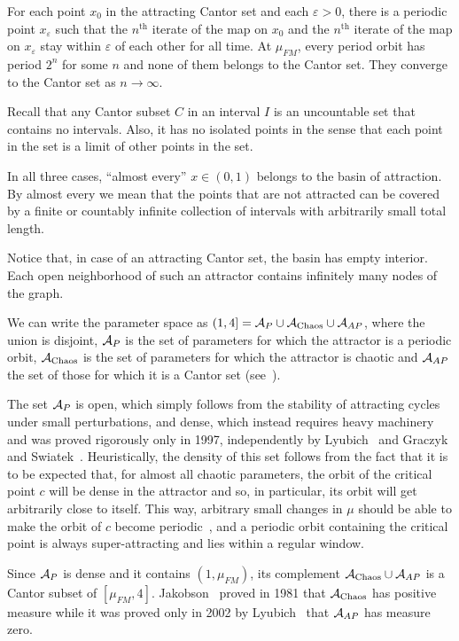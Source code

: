 \documentclass{article}
\def\AP{{\cal A}_P}
\def\AC{{\cal A}_{\text{Chaos}}}
\def\ALP{{\cal A}_{AP}}
\newcommand{\allviolet}{\color{violet}{}}
\begin{document}
For each point $x_0$ in the attracting Cantor set and each $\varepsilon>0$, there is a periodic point $x_{\varepsilon}$ such that the $n^{\text{th}}$ iterate of the map on $x_0$ and the $n^{\text{th}}$ iterate of the map on $x_{\varepsilon}$ stay within $\varepsilon$ of each other for all time. 
At $\mu_{FM}$, every period orbit has period $2^n$ for some $n$ and none of them belongs to the Cantor set. 
They converge to the Cantor set as $n\to\infty$.

Recall that any Cantor subset $C$ in an interval $I$ is an uncountable set that contains no intervals. 
Also, it has no isolated points in the sense that each point in the set is a limit of other points in the set. 

\medskip
In all three cases, ``almost every'' $x\in(0,1)$ belongs to the basin of attraction.
By almost every we mean that the points that are not attracted can be covered by a finite or countably infinite collection of intervals with arbitrarily small total length.

Notice that, in case of an attracting Cantor set, the basin has empty interior. Each open neighborhood of such an attractor contains infinitely many nodes of the graph.




We can write the parameter space as $(1,4]={\cal A}_P\cup\AC\cup\ALP$, where the union is disjoint, ${\cal A}_P$ is the set of parameters for which the attractor is a periodic orbit, $\AC$ is the set of parameters for which the attractor is chaotic and $\ALP$ the set of those for which it is a Cantor set  (see~\cite{JR80}).

The set ${\cal A}_P$ is open, which simply follows from the stability of attracting cycles under small perturbations, and dense, which instead requires heavy machinery and was proved rigorously only in 1997, independently by Lyubich~\cite{Lyu97} and Graczyk and Swiatek~\cite{GS97}. Heuristically, the density of this set follows from the fact that it is to be expected that, for almost all chaotic parameters, the orbit of the critical point $c$ will be dense in the attractor and so, in particular, its orbit will get arbitrarily close to itself. 
This way, arbitrary small changes in $\mu$ should be able to make the orbit of $c$ become periodic~\cite{Ott02}, and a periodic orbit containing the critical point is always super-attracting and lies within a regular window.

Since $\AP$ is dense and it contains $(1,\mu_{FM})$, its complement $\AC\cup\ALP$ is a Cantor subset of $[\mu_{FM},4]$. Jakobson~\cite{Jak81} proved in 1981 that $\AC$ has positive measure while it was proved only in 2002 by Lyubich~\cite{Lyu02} that $\ALP$ has measure zero.
\end{document}
